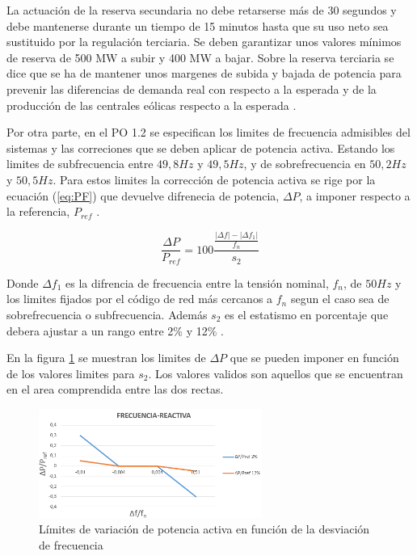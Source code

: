\documentclass{book}
\begin{document}
La actuaci\'on de la reserva secundaria no debe retarserse m\'as de 30 segundos y debe mantenerse durante un tiempo de 15 minutos hasta que su uso neto sea sustituido por la regulaci\'on terciaria. Se deben garantizar unos valores m\'inimos de reserva de 500 MW a subir y 400 MW a bajar. Sobre la reserva terciaria se dice que se ha de mantener unos margenes de subida y bajada de potencia para prevenir las diferencias de demanda real con respecto a la esperada y de la producci\'on de las centrales e\'olicas respecto a la esperada \cite{PO15}. \par

Por otra parte, en el PO 1.2 se especifican los limites de frecuencia admisibles del sistemas y las correciones que se deben aplicar de potencia activa. Estando los limites de subfrecuencia entre $49,8Hz$ y $49,5Hz$, y de sobrefrecuencia en $50,2Hz$ y $50,5Hz$. Para estos limites la correcci\'on de potencia activa se rige por la ecuaci\'on (\ref{eq:PF}) que devuelve difrenecia de potencia, $\Delta P$, a imponer respecto a la referencia, $P_{ref}$ \cite{PO12}. \par

\begin{equation}\label{eq:PF}
	\frac{\Delta P}{P_{ref}}=100 \frac{\frac{|\Delta f|-|\Delta f_1|}{f_n}}{s_2}
\end{equation} \par

Donde $\Delta f_1$ es la difrencia de frecuencia entre la tensión nominal, $f_n$, de $50Hz$ y los limites fijados por el c\'odigo de red m\'as cercanos a $f_n$ segun el caso sea de sobrefrecuencia o subfrecuencia. Adem\'as $s_2$ es el estatismo en porcentaje que debera ajustar a un rango entre 2\% y 12\% \cite{PO12}. \par

En la figura \ref{FPgridcode} se muestran los limites de $\Delta P$ que se pueden imponer en funci\'on de los valores limites para $s_2$. Los valores validos son aquellos que se encuentran en el area comprendida entre las dos rectas. 

\begin{figure}[h!]
\centering
\includegraphics[width=0.65\textwidth]{FPgridcode.PNG}
\caption{L\'imites de variaci\'on de potencia activa en funci\'on de la desviaci\'on de frecuencia}
\label{FPgridcode}
\end{figure}
\end{document}
